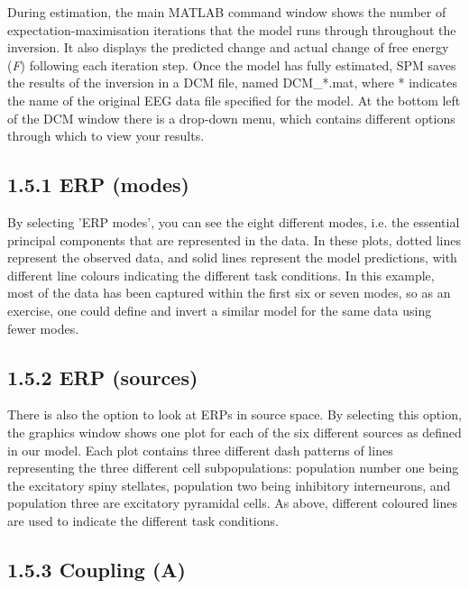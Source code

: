 During estimation, the main MATLAB command window shows the number of
expectation-maximisation iterations that the model runs through
throughout the inversion. It also displays the predicted change and
actual change of free energy (\emph{F}) following each iteration step.
Once the model has fully estimated, SPM saves the results of the
inversion in a DCM file, named DCM\_*.mat, where * indicates the name of
the original EEG data file specified for the model. At the bottom left
of the DCM window there is a drop-down menu, which contains different
options through which to view your results.

\subsection{\texorpdfstring{\textbf{1.5.1 ERP
(modes)}}{1.5.1 ERP (modes)}}\label{erp-modes}

By selecting 'ERP modes', you can see the eight different modes, i.e.
the essential principal components that are represented in the data. In
these plots, dotted lines represent the observed data, and solid lines
represent the model predictions, with different line colours indicating
the different task conditions. In this example, most of the data has
been captured within the first six or seven modes, so as an exercise,
one could define and invert a similar model for the same data using
fewer modes.

\subsection{\texorpdfstring{\textbf{1.5.2 ERP
(sources)}}{1.5.2 ERP (sources)}}\label{erp-sources}

There is also the option to look at ERPs in source space. By selecting
this option, the graphics window shows one plot for each of the six
different sources as defined in our model. Each plot contains three
different dash patterns of lines representing the three different cell
subpopulations: population number one being the excitatory spiny
stellates, population two being inhibitory interneurons, and population
three are excitatory pyramidal cells. As above, different coloured lines
are used to indicate the different task conditions.

\subsection{\texorpdfstring{\textbf{1.5.3 Coupling
(A)}}{1.5.3 Coupling (A)}}\label{coupling-a}

